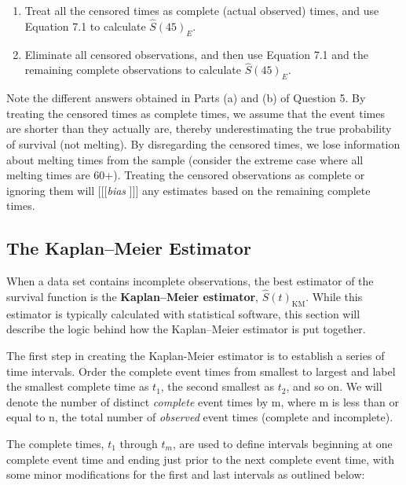 \documentclass[
]{report}
\providecommand{\tightlist}{%
  \setlength{\itemsep}{0pt}\setlength{\parskip}{0pt}}
\begin{document}
\begin{enumerate}
\def\labelenumi{(\alph{enumi})}
\tightlist
\item
  Treat all the censored times as complete (actual observed) times, and use Equation 7.1 to calculate \(\hat S(45)_{E}\).\\
\item
  Eliminate all censored observations, and then use Equation 7.1 and the remaining complete observations to calculate \(\hat S(45)_{E}\).
\end{enumerate}

Note the different answers obtained in Parts (a) and (b) of Question 5. By treating the censored times as complete times, we assume that the event times are shorter than they actually are, thereby underestimating the true probability of survival (not melting). By disregarding the censored times, we lose information about melting times from the sample (consider the extreme case where all melting times are 60+). Treating the censored observations as complete or ignoring them will {[}{[}{[}\emph{bias} {]}{]}{]} any estimates based on the remaining complete times.

\hypertarget{the-kaplanmeier-estimator}{%
\subsection*{The Kaplan--Meier Estimator}\label{the-kaplanmeier-estimator}}

When a data set contains incomplete observations, the best estimator of the survival function is the \textbf{Kaplan--Meier estimator}, \(\hat S(t)_{\text{KM}}\). While this estimator is typically calculated with statistical software, this section will describe the logic behind how the Kaplan--Meier estimator is put together.

The first step in creating the Kaplan-Meier estimator is to establish a series of time intervals. Order the complete event times from smallest to largest and label the smallest complete time as \(t_1\), the second smallest as \(t_2\), and so on. We will denote the number of distinct \emph{complete} event times by m, where m is less than or equal to n, the total number of \emph{observed} event times (complete and incomplete).

The complete times, \(t_1\) through \(t_m\), are used to define intervals beginning at one complete event time and ending just prior to the next complete event time, with some minor modifications for the first and last intervals as outlined below:
\end{document}
